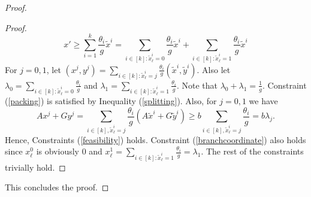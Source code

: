 \documentclass[runningheads]{llncs}
\begin{document}
\begin{proof}
\begin{proof}
		\begin{equation}\label{splitting}
		x'\geq \sum_{i=1}^{k}\frac{\theta_i}{g} \tilde{x}^i
		={\sum_{i\in [k]: \tilde{x}^i_\ell =0}\frac{\theta_i}{g} \tilde{x}^i}+{\sum_{i\in [k]: \tilde{x}^i_\ell =1}\frac{\theta_i}{g} \tilde{x}^i}
		\end{equation}
		For $j=0,1$, let $(x^j,y^j) = \sum_{i\in [k]:\tilde{x}^i_\ell=j} \frac{\theta_i}{g}(\tilde{x}^i,\tilde{y}^i)$. Also let $\lambda_0=\sum_{i\in [k]: \tilde{x}^i_\ell =0}\frac{\theta_i}{g}$ and $\lambda_1 = \sum_{i\in [k]: \tilde{x}^i_\ell =1}\frac{\theta_i}{g}$. Note that $\lambda_0+\lambda_1 = \frac{1}{g}$. Constraint (\ref{packing}) is satisfied by Inequality (\ref{splitting}). Also, for $j=0,1$ we have
		\begin{equation}
		Ax^j+Gy^j = \sum_{i\in[k], \tilde{x}^i_\ell = j} \frac{\theta_i}{g} (A\tilde{x}^i + G\tilde{y}^i) \geq b \sum_{i\in[k], \tilde{x}^i_\ell = j} \frac{\theta_i}{g} = b\lambda_j.
		\end{equation}
		Hence, Constraints (\ref{feasibility}) holds. Constraint (\ref{branchcoordinate}) also holds since $x^0_\ell$ is obviously $0$ and $x^1_\ell= \sum_{i\in [k]: \tilde{x}^i_\ell = 1}\frac{\theta_i}{g}= \lambda_1$. The rest of the constraints trivially hold. 
	\end{proof}
	This concludes the proof.	
\end{proof}
\end{document}
